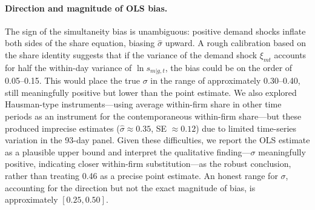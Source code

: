 \documentclass[11pt, a4paper]{article}
\begin{document}
\paragraph{Direction and magnitude of OLS bias.} The sign of the simultaneity bias is unambiguous: positive demand shocks inflate both sides of the share equation, biasing $\hat{\sigma}$ upward. A rough calibration based on the share identity suggests that if the variance of the demand shock $\xi_{mt}$ accounts for half the within-day variance of $\ln s_{m|g,t}$, the bias could be on the order of 0.05--0.15. This would place the true $\sigma$ in the range of approximately 0.30--0.40, still meaningfully positive but lower than the point estimate. We also explored Hausman-type instruments---using average within-firm share in other time periods as an instrument for the contemporaneous within-firm share---but these produced imprecise estimates ($\hat{\sigma} \approx 0.35$, SE $\approx 0.12$) due to limited time-series variation in the 93-day panel. Given these difficulties, we report the OLS estimate as a plausible upper bound and interpret the qualitative finding---$\sigma$ meaningfully positive, indicating closer within-firm substitution---as the robust conclusion, rather than treating 0.46 as a precise point estimate. An honest range for $\sigma$, accounting for the direction but not the exact magnitude of bias, is approximately $[0.25, 0.50]$.
\end{document}
